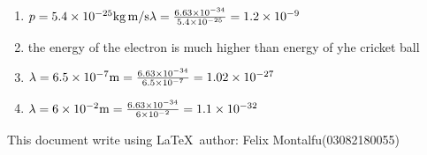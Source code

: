 \documentclass[a4paper]{article}
\begin{document}
\begin{enumerate}[1.]
        \item $p = \num{5.4d-25} \si[per-mode=symbol]{\kilogram\metre\per\second} \\ \lambda = \frac{\num{6.63d-34}}{\num{5.4d-25}} \\ =\num{1.2d-9}$
        \item the energy of the electron is much higher than energy of yhe cricket ball
        \item $\lambda = \num{6.5d-7}\si[per-mode=symbol]{\metre} \\ =\frac{\num{6.63d-34}}{\num{6.5d-7}} \\ = \num{1.02d-27}$
        \item $\lambda = \num{6d-2}\si[per-mode=symbol]{\metre} \\ =\frac{\num{6.63d-34}}{\num{6d-2}} \\ =\num{1.1d-32}$
    \end{enumerate}
    This document write using \LaTeX \ author: Felix Montalfu(03082180055) 
\end{document}
